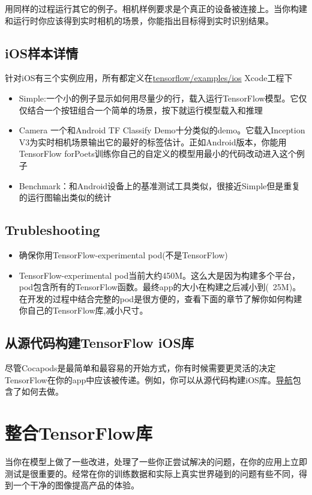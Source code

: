 用同样的过程运行其它的例子。相机样例要求是个真正的设备被连接上。当你构建和运行时你应该得到实时相机的场景，你能指出目标得到实时识别结果。
\subsection{iOS样本详情}
针对iOS有三个实例应用，所有都定义在\href{https://www.github.com/tensorflow/tensorflow/blob/r1.4/tensorflow/examples/ios/}{tensorflow/examples/ios} Xcode工程下
\begin{itemize}
\item Simple:一个小的例子显示如何用尽量少的行，载入运行TensorFlow模型。它仅仅结合一个按钮组合一个简单的场景，按下就运行模型载入和推理
\item Camera 一个和Android TF Classify Demo十分类似的demo。它载入Inception V3为实时相机场景输出它的最好的标签估计。正如Android版本，你能用TensorFlow forPoets训练你自己的自定义的模型用最小的代码改动进入这个例子
\item Benchmark：和Android设备上的基准测试工具类似，很接近Simple但是重复的运行图输出类似的统计
\end{itemize}
\subsection{Trubleshooting}
\begin{itemize}
\item 确保你用TensorFlow-experimental pod(不是TensorFlow)
\item TensorFlow-experimental pod当前大约450M。这么大是因为构建多个平台，pod包含所有的TensorFlow函数。最终app的大小在构建之后减小到(~25M)。在开发的过程中结合完整的pod是很方便的，查看下面的章节了解你如何构建你自己的TensorFlow库,减小尺寸。
\end{itemize}
\subsection{从源代码构建TensorFlow iOS库}
尽管Cocapods是最简单和最容易的开始方式，你有时候需要更灵活的决定TensorFlow在你的app中应该被传递。例如，你可以从源代码构建iOS库。\href{https://github.com/tensorflow/tensorflow/tree/master/tensorflow/examples/ios#building-the-tensorflow-ios-libraries-from-source}{导航}包含了如何去做。
\section{整合TensorFlow库}
当你在模型上做了一些改进，处理了一些你正尝试解决的问题，在你的应用上立即测试是很重要的。经常在你的训练数据和实际上真实世界碰到的问题有些不同，得到一个干净的图像提高产品的体验。

